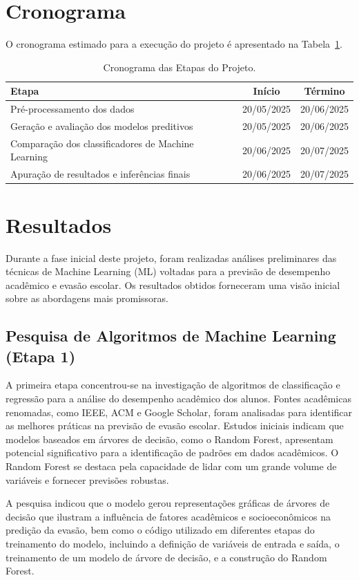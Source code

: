 \documentclass[12pt]{article}
\begin{document}
\section{Cronograma}
O cronograma estimado para a execução do projeto é apresentado na Tabela~\ref{tab:cronograma}.
\clearpage
\begin{table}[h!]
\centering
\caption{Cronograma das Etapas do Projeto.}
\label{tab:cronograma}
\begin{tabular}{@{}lcc@{}}
\toprule
\textbf{Etapa} & \textbf{Início} & \textbf{Término} \\
\midrule
Pré-processamento dos dados & 20/05/2025 & 20/06/2025 \\
Geração e avaliação dos modelos preditivos & 20/05/2025 & 20/06/2025 \\
Comparação dos classificadores de Machine Learning & 20/06/2025 & 20/07/2025 \\
Apuração de resultados e inferências finais & 20/06/2025 & 20/07/2025 \\
\bottomrule
\end{tabular}
\end{table}

\section{Resultados}

Durante a fase inicial deste projeto, foram realizadas análises preliminares das técnicas de Machine Learning (ML) voltadas para a previsão de desempenho acadêmico e evasão escolar. Os resultados obtidos forneceram uma visão inicial sobre as abordagens mais promissoras.

\subsection{Pesquisa de Algoritmos de Machine Learning (Etapa 1)}
A primeira etapa concentrou-se na investigação de algoritmos de classificação e regressão para a análise do desempenho acadêmico dos alunos. Fontes acadêmicas renomadas, como IEEE, ACM e Google Scholar, foram analisadas para identificar as melhores práticas na previsão de evasão escolar. Estudos iniciais indicam que modelos baseados em árvores de decisão, como o Random Forest, apresentam potencial significativo para a identificação de padrões em dados acadêmicos. O Random Forest se destaca pela capacidade de lidar com um grande volume de variáveis e fornecer previsões robustas.

A pesquisa indicou que o modelo gerou representações gráficas de árvores de decisão que ilustram a influência de fatores acadêmicos e socioeconômicos na predição da evasão, bem como o código utilizado em diferentes etapas do treinamento do modelo, incluindo a definição de variáveis de entrada e saída, o treinamento de um modelo de árvore de decisão, e a construção do Random Forest.
\end{document}
